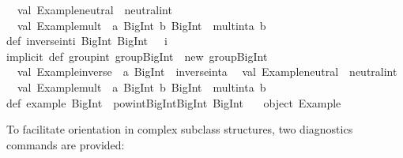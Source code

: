\begin{isabellebody}
\begin{isamarkuptext}
\begin{typewriter}
\ \ val\ {\isacharbackquote}Example{\isachardot}neutral{\isacharbackquote}\ {\isacharequal}\ neutral{\isacharunderscore}int\isanewline
\ \ val\ {\isacharbackquote}Example{\isachardot}mult{\isacharbackquote}\ {\isacharequal}\ {\isacharparenleft}a{\isacharcolon}\ BigInt{\isacharcomma}\ b{\isacharcolon}\ BigInt{\isacharparenright}\ {\isacharequal}{\isachargreater}\ mult{\isacharunderscore}int{\isacharparenleft}a{\isacharcomma}\ b{\isacharparenright}\isanewline
{\isacharbraceright}\isanewline
\isanewline
def\ inverse{\isacharunderscore}int{\isacharparenleft}i{\isacharcolon}\ BigInt{\isacharparenright}{\isacharcolon}\ BigInt\ {\isacharequal}\ {\isacharparenleft}{\isacharminus}\ i{\isacharparenright}\isanewline
\isanewline
implicit\ def\ group{\isacharunderscore}int{\isacharcolon}\ group{\isacharbrackleft}BigInt{\isacharbrackright}\ {\isacharequal}\ new\ group{\isacharbrackleft}BigInt{\isacharbrackright}\ {\isacharbraceleft}\isanewline
\ \ val\ {\isacharbackquote}Example{\isachardot}inverse{\isacharbackquote}\ {\isacharequal}\ {\isacharparenleft}a{\isacharcolon}\ BigInt{\isacharparenright}\ {\isacharequal}{\isachargreater}\ inverse{\isacharunderscore}int{\isacharparenleft}a{\isacharparenright}\isanewline
\ \ val\ {\isacharbackquote}Example{\isachardot}neutral{\isacharbackquote}\ {\isacharequal}\ neutral{\isacharunderscore}int\isanewline
\ \ val\ {\isacharbackquote}Example{\isachardot}mult{\isacharbackquote}\ {\isacharequal}\ {\isacharparenleft}a{\isacharcolon}\ BigInt{\isacharcomma}\ b{\isacharcolon}\ BigInt{\isacharparenright}\ {\isacharequal}{\isachargreater}\ mult{\isacharunderscore}int{\isacharparenleft}a{\isacharcomma}\ b{\isacharparenright}\isanewline
{\isacharbraceright}\isanewline
\isanewline
def\ example{\isacharcolon}\ BigInt\ {\isacharequal}\ pow{\isacharunderscore}int{\isacharbrackleft}BigInt{\isacharbrackright}{\isacharparenleft}BigInt{\isacharparenleft}{}{}{\isacharparenright}{\isacharcomma}\ BigInt{\isacharparenleft}{\isacharminus}\ {}{\isacharparenright}{\isacharparenright}\isanewline
\isanewline
{\isacharbraceright}\ {\isacharslash}{\isacharasterisk}\ object\ Example\ {\isacharasterisk}{\isacharslash}\isanewline

  \end{typewriter}%
\end{isamarkuptext}%
\isamarkuptrue%
%
\endisatagquote
{\isafoldquote}%
%
\isadelimquote
%
\endisadelimquote
%
\isamarkuptrue%
%
\begin{isamarkuptext}%
To facilitate orientation in complex subclass structures, two
  diagnostics commands are provided:


\end{isamarkuptext}
\end{isabellebody}
